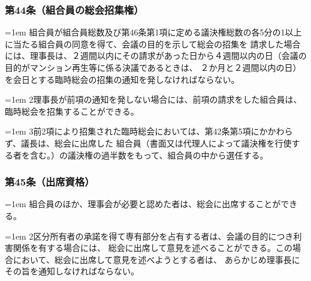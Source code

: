 \documentclass[
  luatex,
  paper=a4paper,
  fontsize=11pt,
  jafontsize=11pt,
  jlreq_notes,
]{jlreq}
\newcommand{\joumain}[1]{%
  \noindent\hangindent=1em\hangafter=1
  \hspace{1em}#1%
}
\newcommand{\kou}[2]{%
  \par\noindent\hangindent=1em\hangafter=1
  #1\hspace{1em}#2%
}
\begin{document}
  \subsubsection*{第44条（組合員の総会招集権）}
  \joumain{組合員が組合員総数及び第46条第1項に定める議決権総数の各5分の1以上に当たる組合員の同意を得て、会議の目的を示して総会の招集を
  請求した場合には、理事長は、２週間以内にその請求があった日から４週間以内の日（会議の目的がマンション再生等に係る決議であるときは、
  ２か月と２週間以内の日）を会日とする臨時総会の招集の通知を発しなければならない。}
  \kou{2}{理事長が前項の通知を発しない場合には、前項の請求をした組合員は、臨時総会を招集することができる。}
  \kou{3}{前2項により招集された臨時総会においては、第42条第5項にかかわらず、議長は、総会に出席した
  組合員（書面又は代理人によって議決権を行使する者を含む。）の議決権の過半数をもって、組合員の中から選任する。}

  \subsubsection*{第45条（出席資格）}
  \joumain{組合員のほか、理事会が必要と認めた者は、総会に出席することができる。}
  \kou{2}{区分所有者の承諾を得て専有部分を占有する者は、会議の目的につき利害関係を有する場合には、
  総会に出席して意見を述べることができる。この場合において、総会に出席して意見を述べようとする者は、
  あらかじめ理事長にその旨を通知しなければならない。}
\end{document}
